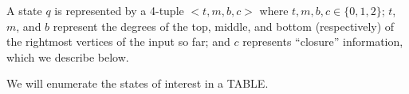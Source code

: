A state $q$ is represented by a 4-tuple $<t, m, b, c>$ where $t, m, b, c\in \{0, 1, 2\}$; $t$, $m$, and $b$ represent the degrees of the top, middle, and bottom (respectively) of the rightmost vertices of the input so far; and $c$ represents ``closure'' information, which we describe below.

We will enumerate the states of interest in a TABLE.


